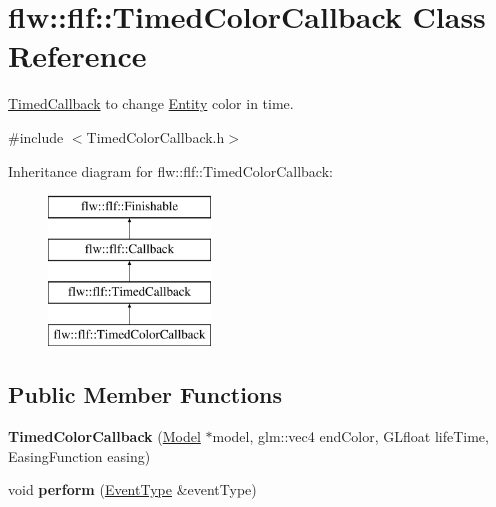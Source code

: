 \hypertarget{classflw_1_1flf_1_1TimedColorCallback}{}\section{flw\+:\+:flf\+:\+:Timed\+Color\+Callback Class Reference}
\label{classflw_1_1flf_1_1TimedColorCallback}


\hyperlink{classflw_1_1flf_1_1TimedCallback}{Timed\+Callback} to change \hyperlink{classflw_1_1flf_1_1Entity}{Entity} color in time.  




{\ttfamily \#include $<$Timed\+Color\+Callback.\+h$>$}

Inheritance diagram for flw\+:\+:flf\+:\+:Timed\+Color\+Callback\+:\begin{figure}[H]
\begin{center}
\leavevmode
\includegraphics[height=4.000000cm]{classflw_1_1flf_1_1TimedColorCallback}
\end{center}
\end{figure}
\subsection*{Public Member Functions}
\begin{DoxyCompactItemize}
\item 
{\bfseries Timed\+Color\+Callback} (\hyperlink{classflw_1_1flf_1_1Model}{Model} $\ast$model, glm\+::vec4 end\+Color, G\+Lfloat life\+Time, Easing\+Function easing)\hypertarget{classflw_1_1flf_1_1TimedColorCallback_a23aef1c8dd9cac1bc7c4cb207190611c}{}\label{classflw_1_1flf_1_1TimedColorCallback_a23aef1c8dd9cac1bc7c4cb207190611c}

\item 
void {\bfseries perform} (\hyperlink{classflw_1_1flf_1_1EventType}{Event\+Type} \&event\+Type)\hypertarget{classflw_1_1flf_1_1TimedColorCallback_a6f967da4303f77cbba5be0f4e958ae5d}{}\label{classflw_1_1flf_1_1TimedColorCallback_a6f967da4303f77cbba5be0f4e958ae5d}

\end{DoxyCompactItemize}
